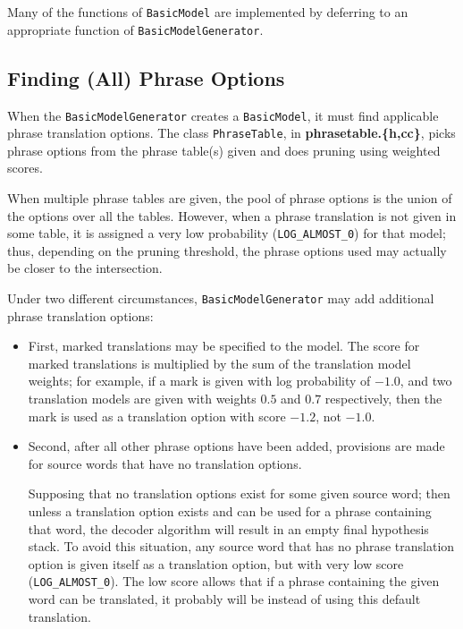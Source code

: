 \documentclass[12pt]{amsart} \usepackage{epsfig} \usepackage{rotating}
\newcommand{\file}{\textbf} \newcommand{\url}{\underline}
\newcommand{\code}{\small\texttt}
\begin{document}
Many of the functions of \code{BasicModel} are implemented by deferring to an
appropriate function of \code{BasicModelGenerator}.

\subsection{Finding (All) Phrase Options}
When the \code{BasicModelGenerator} creates a \code{BasicModel}, it must find
applicable phrase translation options.  The class \code{PhraseTable}, in
\file{phrasetable.\{h,cc\}}, picks phrase options from the phrase table(s)
given and does pruning using weighted scores.

When multiple phrase tables are given, the pool of phrase options is the union
of the options over all the tables.  However, when a phrase translation is not
given in some table, it is assigned a very low probability
(\code{LOG\_ALMOST\_0}) for that model; thus, depending on the pruning
threshold, the phrase options used may actually be closer to the intersection.

Under two different circumstances, \code{BasicModelGenerator} may add
additional phrase translation options:

\begin{itemize}
\item
First, marked translations may be specified to the model.  The score for marked
translations is multiplied by the sum of the translation model weights; for
example, if a mark is given with log probability of $-1.0$, and two translation
models are given with weights $0.5$ and $0.7$ respectively, then the mark is
used as a translation option with score $-1.2$, not $-1.0$.

\item
Second, after all other phrase options have been added, provisions are made for
source words that have no translation options.

Supposing that no translation options exist for some given source word; then
unless a translation option exists and can be used for a phrase containing that
word, the decoder algorithm will result in an empty final hypothesis stack.  To
avoid this situation, any source word that has no phrase translation option is
given itself as a translation option, but with very low score
(\code{LOG\_ALMOST\_0}).  The low score allows that if a phrase containing the
given word can be translated, it probably will be instead of using this default
translation.
\end{itemize}
\end{document}

